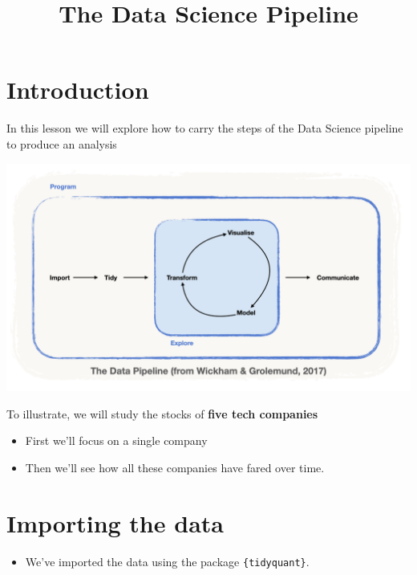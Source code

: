 \documentclass[
  letterpaper,
  DIV=11,
  numbers=noendperiod]{scrreprt}
\title{The Data Science Pipeline}
\author{}
\date{}
\providecommand{\tightlist}{%
  \setlength{\itemsep}{0pt}\setlength{\parskip}{0pt}}\usepackage{longtable,booktabs,array}
\renewcommand*\contentsname{Table of contents}
\newcommand\contentsname{Table of contents}
\theoremstyle{definition}
\theoremstyle{remark}
\begin{document}
\maketitle

\renewcommand*\contentsname{Table of contents}
{
\hypersetup{linkcolor=}
\setcounter{tocdepth}{2}
\tableofcontents
}

\chapter{Introduction}\label{introduction}

In this lesson we will explore how to carry the steps of the Data
Science pipeline to produce an analysis

\includegraphics{img/fig-data-pipeline-empty.png}

To illustrate, we will study the stocks of \textbf{five tech companies}

\begin{itemize}
\item
  First we'll focus on a single company
\item
  Then we'll see how all these companies have fared over time.
\end{itemize}


\chapter{Importing the data}\label{importing-the-data}

\begin{itemize}
\tightlist
\item
  We've imported the data using the package \texttt{\{tidyquant\}}.
\end{itemize}
\end{document}
